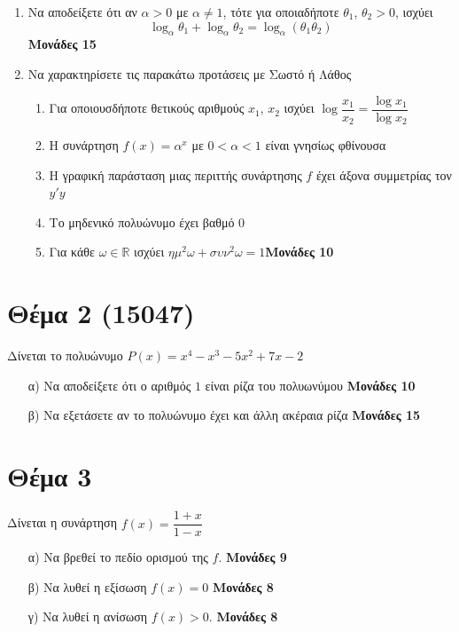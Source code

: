 \documentclass[12pt]{extarticle}
\begin{document}
\begin{enumerate}
    \item Να αποδείξετε ότι αν $α>0$ με $α \ne 1$, τότε για οποιαδήποτε $θ_1$, $θ_2>0$, ισχύει $$\log_α θ_1+\log_α θ_2=\log_α(θ_1 θ_2)$$ \hspace*{\fill} \textbf{Μονάδες 15}

    \item Να χαρακτηρίσετε τις παρακάτω προτάσεις με Σωστό ή Λάθος
          \begin{enumerate}
              \item Για οποιουσδήποτε θετικούς αριθμούς $x_1$, $x_2$ ισχύει $\log\dfrac{x_1}{x_2}=\dfrac{\log x_1}{\log x_2}$
              \item Η συνάρτηση $f(x)=α^x$ με $0<α<1$ είναι γνησίως φθίνουσα
              \item Η γραφική παράσταση μιας περιττής συνάρτησης $f$ έχει άξονα συμμετρίας τον $y'y$
              \item Το μηδενικό πολυώνυμο έχει βαθμό 0
              \item Για κάθε $ω\in\mathbb{R}$ ισχύει $ημ^2ω+συν^2ω=1$\hspace*{\fill}\textbf{Μονάδες 10}
          \end{enumerate}
\end{enumerate}

\section*{Θέμα 2 (15047)}
\noindent
Δίνεται το πολυώνυμο $P(x)=x^4-x^3-5x^2+7x-2$
\begin{enumerate}
    \item[α)] Να αποδείξετε ότι ο αριθμός $1$ είναι ρίζα του πολυωνύμου \hspace*{\fill} \textbf{Μονάδες 10}
    \item[β)] Να εξετάσετε αν το πολυώνυμο έχει και άλλη ακέραια ρίζα \hspace*{\fill} \textbf{Μονάδες 15}
\end{enumerate}

\section*{Θέμα 3}
\noindent

Δίνεται η συνάρτηση $f(x)=\dfrac{1+x}{1-x}$
\begin{enumerate}
    \item[α)] Να βρεθεί το πεδίο ορισμού της $f$. \hspace*{\fill} \textbf{Μονάδες 9}
    \item[β)] Να λυθεί η εξίσωση $f(x)=0$ \hspace*{\fill} \textbf{Μονάδες 8}
    \item[γ)] Να λυθεί η ανίσωση $f(x)>0$. \hspace*{\fill} \textbf{Μονάδες 8}
\end{enumerate}
\end{document}
